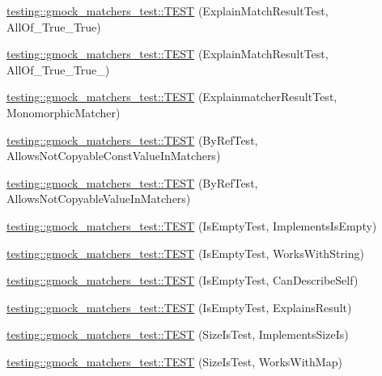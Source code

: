 \begin{DoxyCompactItemize}
\item 
\hyperlink{namespacetesting_1_1gmock__matchers__test_a16545b298640b253502d604f52ea95e2}{testing\+::gmock\+\_\+matchers\+\_\+test\+::\+T\+E\+ST} (Explain\+Match\+Result\+Test, All\+Of\+\_\+\+True\+\_\+\+True)
\item 
\hyperlink{namespacetesting_1_1gmock__matchers__test_af1ba4010a24716a51a302f9a518023b5}{testing\+::gmock\+\_\+matchers\+\_\+test\+::\+T\+E\+ST} (Explain\+Match\+Result\+Test, All\+Of\+\_\+\+True\+\_\+\+True\+\_)
\item 
\hyperlink{namespacetesting_1_1gmock__matchers__test_a102b10d9064f6e0037e3f3f0c3e76e22}{testing\+::gmock\+\_\+matchers\+\_\+test\+::\+T\+E\+ST} (Explainmatcher\+Result\+Test, Monomorphic\+Matcher)
\item 
\hyperlink{namespacetesting_1_1gmock__matchers__test_aab82f120c70dc7d8bc2fd74ac6897486}{testing\+::gmock\+\_\+matchers\+\_\+test\+::\+T\+E\+ST} (By\+Ref\+Test, Allows\+Not\+Copyable\+Const\+Value\+In\+Matchers)
\item 
\hyperlink{namespacetesting_1_1gmock__matchers__test_a5ed7b822889a34f018c2ba8f21941fd4}{testing\+::gmock\+\_\+matchers\+\_\+test\+::\+T\+E\+ST} (By\+Ref\+Test, Allows\+Not\+Copyable\+Value\+In\+Matchers)
\item 
\hyperlink{namespacetesting_1_1gmock__matchers__test_ab63796f77c7572f6f1aef01cb140f99e}{testing\+::gmock\+\_\+matchers\+\_\+test\+::\+T\+E\+ST} (Is\+Empty\+Test, Implements\+Is\+Empty)
\item 
\hyperlink{namespacetesting_1_1gmock__matchers__test_a22f0cacccee169b7390741b9815f4281}{testing\+::gmock\+\_\+matchers\+\_\+test\+::\+T\+E\+ST} (Is\+Empty\+Test, Works\+With\+String)
\item 
\hyperlink{namespacetesting_1_1gmock__matchers__test_adcf3743190f973f2773296d0772e8950}{testing\+::gmock\+\_\+matchers\+\_\+test\+::\+T\+E\+ST} (Is\+Empty\+Test, Can\+Describe\+Self)
\item 
\hyperlink{namespacetesting_1_1gmock__matchers__test_a1c168c284000d05d63bf5e9df10d1b7c}{testing\+::gmock\+\_\+matchers\+\_\+test\+::\+T\+E\+ST} (Is\+Empty\+Test, Explains\+Result)
\item 
\hyperlink{namespacetesting_1_1gmock__matchers__test_abe619d5d1910e1f2e8b169622d1d8592}{testing\+::gmock\+\_\+matchers\+\_\+test\+::\+T\+E\+ST} (Size\+Is\+Test, Implements\+Size\+Is)
\item 
\hyperlink{namespacetesting_1_1gmock__matchers__test_aea77169d6c56b88b5c99273d5a2bc0f2}{testing\+::gmock\+\_\+matchers\+\_\+test\+::\+T\+E\+ST} (Size\+Is\+Test, Works\+With\+Map)

\end{DoxyCompactItemize}
